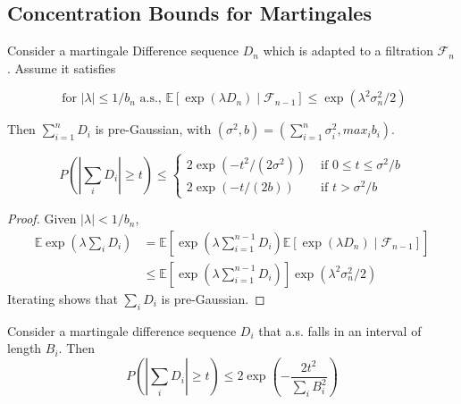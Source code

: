 \subsection{Concentration Bounds for Martingales}
\begin{theorem} \cite*{Bartlett:2020}
  Consider a martingale Difference sequence $D_n$ which is adapted to a filtration $\mathcal{F}_n$. 
  Assume it satisfies 

  \begin{equation}
    \text { for }|\lambda| \leq 1 / b_{n} \text { a.s., } \mathbb{E}\left[\exp \left(\lambda D_{n}\right) \mid \mathcal{F}_{n-1}\right] \leq \exp \left(\lambda^{2} \sigma_{n}^{2} / 2\right)
  \end{equation}

  Then $\sum_{i=1}^n D_i$ is pre-Gaussian, with $(\sigma^2, b) = (\sum_{i=1}^n \sigma_{i}^2, max_{i} b_i)$.

  \begin{equation}
    P\left(\left|\sum_{i} D_{i}\right| \geq t\right) \leq\left\{\begin{array}{ll}
    2 \exp \left(-t^{2} /\left(2 \sigma^{2}\right)\right) & \text { if } 0 \leq t \leq \sigma^{2} / b \\
    2 \exp (-t /(2 b)) & \text { if } t>\sigma^{2} / b
    \end{array}\right.
  \end{equation}
\end{theorem}

\begin{proof}
  Given $\left| \lambda \right| < 1/b_n$,
  \begin{equation}
    \begin{aligned}
    \mathbb{E} \exp \left(\lambda \sum_{i} D_{i}\right) &=\mathbb{E}\left[\exp \left(\lambda \sum_{i=1}^{n-1} D_{i}\right) \mathbb{E}\left[\exp \left(\lambda D_{n}\right) \mid \mathcal{F}_{n-1}\right]\right] \\
    & \leq \mathbb{E}\left[\exp \left(\lambda \sum_{i=1}^{n-1} D_{i}\right)\right] \exp \left(\lambda^{2} \sigma_{n}^{2} / 2\right)
    \end{aligned}
  \end{equation}
  Iterating shows that $\sum_i D_i$ is pre-Gaussian.
\end{proof}

\begin{theorem} \cite*{Bartlett:2020}
  Consider a martingale difference sequence $D_i$ that a.s. falls in an interval of length $B_i$. Then
  \begin{equation}
    P\left(\left|\sum_{i} D_{i}\right| \geq t\right) \leq 2 \exp \left(-\frac{2 t^{2}}{\sum_{i} B_{i}^{2}}\right)
  \end{equation}
\end{theorem}

